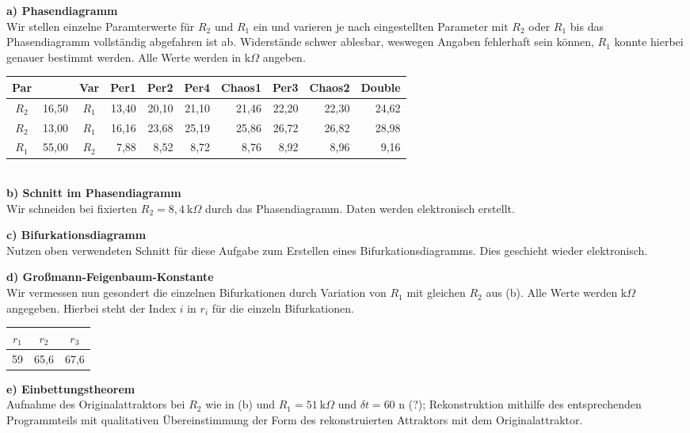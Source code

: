 \textbf{a) Phasendiagramm}\\
Wir stellen einzelne Paramterwerte für $R_2$ und $R_1$ ein und varieren je nach eingestellten Parameter mit $R_2$ oder $R_1$ bis das Phasendiagramm vollständig abgefahren ist ab. Widerstände schwer ablesbar, weswegen Angaben fehlerhaft sein können, $R_1$ konnte hierbei genauer bestimmt werden. Alle Werte werden in $\text{k}\Omega$ angeben.\\
\begin{tabular}{c  r| c  r  r  r  r  r  r  r}
    Par &  & Var & Per1 & Per2 & Per4 & Chaos1 & Per3 & Chaos2 & Double\\
    \hline
    $R_2$ & 16,50 & $R_1$ & 13,40 & 20,10 & 21,10 & 21,46 & 22,20 & 22,30 & 24,62\\
    $R_2$ & 13,00 & $R_1$ & 16,16 & 23,68 & 25,19 & 25,86 & 26,72 & 26,82 & 28,98\\
    $R_1$ & 55,00 & $R_2$ & 7,88  & 8,52 & 8,72 & 8,76 & 8,92 & 8,96 & 9,16\\
\end{tabular}\\

\textbf{b) Schnitt im Phasendiagramm}\\
Wir schneiden bei fixierten $R_2=8,4~\text{k}\Omega$ durch das Phasendiagramm.
Daten werden elektronisch erstellt.

\textbf{c) Bifurkationsdiagramm}\\
Nutzen oben verwendeten Schnitt für diese Aufgabe zum Erstellen eines Bifurkationsdiagramms. Dies geschieht wieder elektronisch.

\textbf{d) Großmann-Feigenbaum-Konstante}\\
Wir vermessen nun gesondert die einzelnen Bifurkationen durch Variation von $R_1$ mit gleichen $R_2$ aus (b). Alle Werte werden $\text{k}\Omega$ angegeben. Hierbei steht der Index $i$ in $r_i$ für die einzeln Bifurkationen.\\
\begin{tabular}{c c c}
    $r_1$ & $r_2$ & $r_3$\\
    \hline
    59 & 65,6 & 67,6
\end{tabular}

\textbf{e) Einbettungstheorem}\\
Aufnahme des Originalattraktors bei $R_2$ wie in (b) und $R_1=51~\text{k}\Omega$ und $\delta t=60$ n (?); Rekonstruktion mithilfe des entsprechenden Programmteils mit qualitativen Übereinstimmung der Form des rekonstruierten Attraktors mit dem Originalattraktor.


%
%
